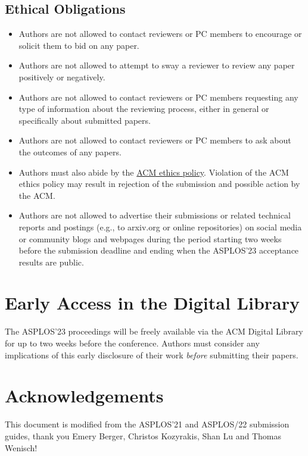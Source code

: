 \documentclass[pageno]{jpaper}
\begin{document}
\subsection{Ethical Obligations}
\begin{itemize}
\item Authors are not allowed to contact reviewers or PC members to encourage or solicit them to bid on any paper.
\item Authors are not allowed to attempt to sway a reviewer to review any paper positively or negatively.
\item Authors are not allowed to contact reviewers or PC members requesting any type of information about the reviewing process, either in general or specifically about submitted papers.
\item Authors are not allowed to contact reviewers or PC members to ask about the outcomes of any papers.
\item Authors must also abide by the
  \href{https://www.acm.org/code-of-ethics}{ACM ethics
    policy}. Violation of the ACM ethics policy may result in
  rejection of the submission and possible action by the ACM.
 \item Authors are not allowed to advertise their submissions or related technical reports and postings (e.g., to arxiv.org or online repositories) on social media or community blogs and webpages during the period starting two weeks before the submission deadline and ending when the ASPLOS’23 acceptance results are public.
\end{itemize}

\section{Early Access in the Digital Library}

The ASPLOS'23 proceedings will be freely available via the ACM Digital
Library for up to two weeks before the
conference. Authors must consider any implications of this early
disclosure of their work {\em before} submitting their papers.



\section{Acknowledgements}

This document is modified from the ASPLOS'21 and ASPLOS/22 submission guides, thank
you Emery Berger, Christos Kozyrakis, Shan Lu and Thomas Wenisch!



\end{document}
